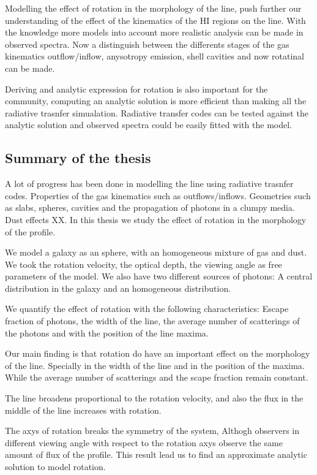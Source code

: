 Modelling the effect of rotation in the morphology of the \ly line, push
further our understanding of the effect of the kinematics of the HI regions
on the line. With the knowledge more models into account more 
realistic analysis can be made in observed \ly spectra. 
Now a distinguish between the differents stages of the gas kinematics
 outflow/inflow, anysotropy \ly emission, shell cavities and now
 rotatinal can be made.

Deriving and analytic expression for rotation is also important for
the community, computing an analytic solution is more efficient than
making all the radiative trasnfer simualation. Radiative transfer codes
can be tested against the analytic solution and observed spectra could
be easily fitted  with the model. 

\subsection{Summary of the thesis}

A lot of progress has been done in modelling the \ly line using radiative
trasnfer codes. Properties of the gas kinematics such as outflows/inflows. 
Geometries such as slabs, spheres, cavities and the propagation of \ly photons
in a clumpy media. Dust effects XX. In this thesis we study the effect 
of rotation in the morphology of the \ly profile.  

We model a galaxy as an sphere, with an homogeneous mixture of gas and dust. 
We took the rotation velocity, the optical depth, the viewing angle as free
parameters of the model. We also have two different sources of \ly photons:
A central distribution in the galaxy and an homogeneous distribution. 

We quantify the effect of rotation with the following characteristics: 
Escape fraction of \ly photons, the width of the \ly line, the average number
of scatterings of the \ly photons and with the position of the \ly line maxima.

Our main finding is that rotation do have an important effect on the morphology 
of the \ly line. Specially in the width of the line and in the position of the 
maxima. While the average number of scatterings  and the scape
fraction remain constant.

The line broadens proportional to the rotation velocity, and also the flux in 
the middle of the line increases with rotation.

The axys of rotation breaks the symmetry of the system, Althogh 
observers in different viewing angle with respect to the rotation axys
observe the same amount of flux of the \ly profile. This result
lead us to find an approximate analytic solution to model rotation.
 
